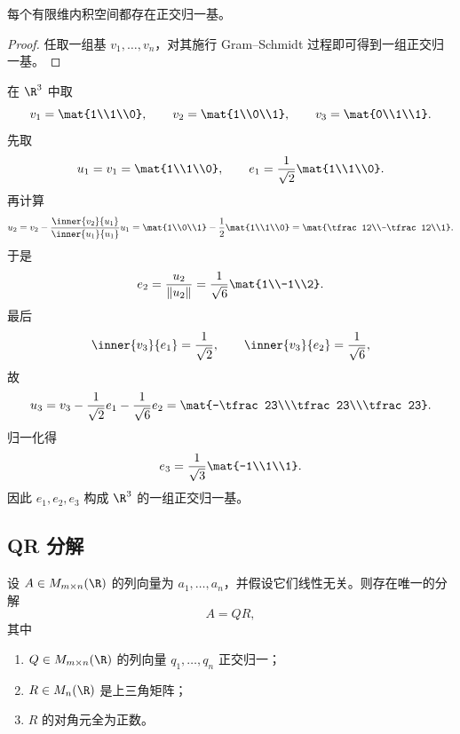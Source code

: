 \begin{corollary}
每个有限维内积空间都存在正交归一基。
\end{corollary}

\begin{proof}
任取一组基 $v_1,\dots,v_n$，对其施行 Gram--Schmidt 过程即可得到一组正交归一基。
\end{proof}

\begin{example}
在 $\R^3$ 中取
\[
v_1=\mat{1\\1\\0},\qquad v_2=\mat{1\\0\\1},\qquad v_3=\mat{0\\1\\1}.
\]
先取
\[
u_1=v_1=\mat{1\\1\\0},\qquad e_1=\frac{1}{\sqrt2}\mat{1\\1\\0}.
\]
再计算
\[
u_2=v_2-\frac{\inner{v_2}{u_1}}{\inner{u_1}{u_1}}u_1
=\mat{1\\0\\1}-\frac{1}{2}\mat{1\\1\\0}
=\mat{\tfrac12\\-\tfrac12\\1}.
\]
于是
\[
e_2=\frac{u_2}{\|u_2\|}=\frac{1}{\sqrt6}\mat{1\\-1\\2}.
\]
最后
\[
\inner{v_3}{e_1}=\frac{1}{\sqrt2},\qquad \inner{v_3}{e_2}=\frac{1}{\sqrt6},
\]
故
\[
u_3=v_3-\frac{1}{\sqrt2}e_1-\frac{1}{\sqrt6}e_2
=\mat{-\tfrac23\\\tfrac23\\\tfrac23}.
\]
归一化得
\[
e_3=\frac{1}{\sqrt3}\mat{-1\\1\\1}.
\]
因此 $e_1,e_2,e_3$ 构成 $\R^3$ 的一组正交归一基。
\end{example}

\subsection{QR 分解}

\begin{theorem}[QR 分解]
设 $A\in M_{m\times n}(\R)$ 的列向量为 $a_1,\dots,a_n$，并假设它们线性无关。则存在唯一的分解
\[
A=QR,
\]
其中
\begin{enumerate}[label=\textnormal{(\arabic*)}]
  \item $Q\in M_{m\times n}(\R)$ 的列向量 $q_1,\dots,q_n$ 正交归一；
  \item $R\in M_n(\R)$ 是上三角矩阵；
  \item $R$ 的对角元全为正数。
\end{enumerate}
\end{theorem}

